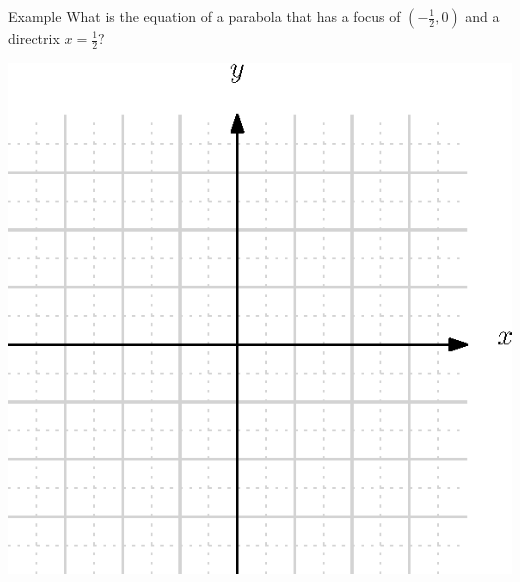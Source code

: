\documentclass[presentation]{beamer}
\begin{document}
\begin{frame}[label={sec:orgb5782c0}]{Example}
What is the equation of a parabola that has a focus of \(\left(
-\frac{1}{2},0 \right)\) and a directrix \(x = \frac{1}{2}?\)

\includegraphics[scale=0.9]{./blank_grid}
\vspace{10in}
\end{frame}
\end{document}
